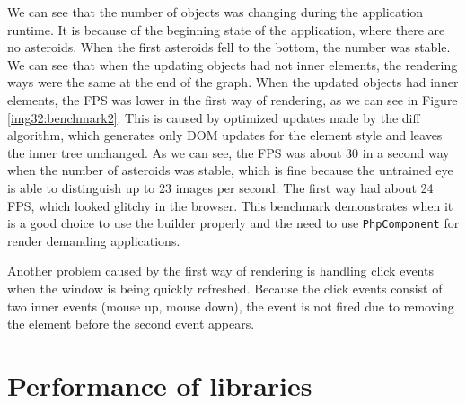 We can see that the number of objects was changing during the application runtime.
It is because of the beginning state of the application, where there are no asteroids.
When the first asteroids fell to the bottom, the number was stable.
We can see that when the updating objects had not inner elements, the rendering ways were the same at the end of the graph.
When the updated objects had inner elements, the FPS was lower in the first way of rendering, as we can see in Figure \ref{img32:benchmark2}.
This is caused by optimized updates made by the diff algorithm, which generates only DOM updates for the element style and leaves the inner tree unchanged.
As we can see, the FPS was about 30 in a second way when the number of asteroids was stable, which is fine because the untrained eye is able to distinguish up to 23 images per second.
The first way had about 24 FPS, which looked glitchy in the browser.
This benchmark demonstrates when it is a good choice to use the builder properly and the need to use \texttt{PhpComponent} for render demanding applications.
\par
Another problem caused by the first way of rendering is handling click events when the window is being quickly refreshed.
Because the click events consist of two inner events (mouse up, mouse down), the event is not fired due to removing the element before the second event appears.

\section{Performance of libraries}

